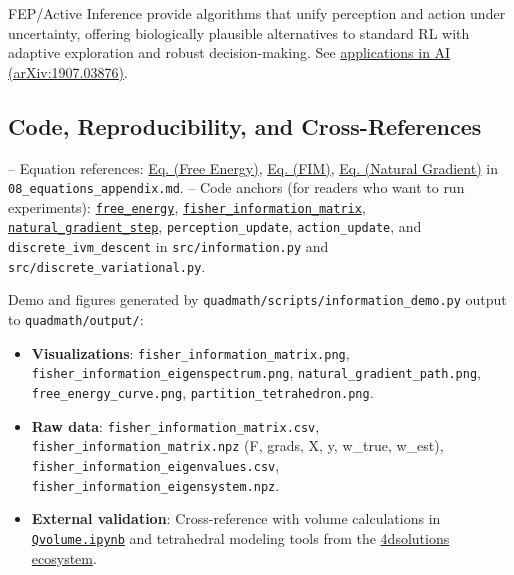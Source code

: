 \documentclass[
  10pt,
]{article}
\providecommand{\tightlist}{%
  \setlength{\itemsep}{0pt}\setlength{\parskip}{0pt}}
\begin{document}
FEP/Active Inference provide algorithms that unify perception and action
under uncertainty, offering biologically plausible alternatives to
standard RL with adaptive exploration and robust decision-making. See
\href{https://arxiv.org/abs/1907.03876}{applications in AI
(arXiv:1907.03876)}.

\hypertarget{code-reproducibility-and-cross-references}{%
\subsection{Code, Reproducibility, and
Cross-References}\label{code-reproducibility-and-cross-references}}

-- Equation references:
\href{08_equations_appendix.md\#eq:free_energy}{Eq. (Free Energy)},
\href{08_equations_appendix.md\#eq:fim}{Eq. (FIM)},
\href{08_equations_appendix.md\#eq:natgrad}{Eq. (Natural Gradient)} in
\texttt{08\_equations\_appendix.md}. -- Code anchors (for readers who
want to run experiments):
\href{03_quadray_methods.md\#code:free_energy}{\texttt{free\_energy}},
\href{03_quadray_methods.md\#code:fisher_information_matrix}{\texttt{fisher\_information\_matrix}},
\href{03_quadray_methods.md\#code:natural_gradient_step}{\texttt{natural\_gradient\_step}},
\texttt{perception\_update}, \texttt{action\_update}, and
\texttt{discrete\_ivm\_descent} in \texttt{src/information.py} and
\texttt{src/discrete\_variational.py}.

Demo and figures generated by
\texttt{quadmath/scripts/information\_demo.py} output to
\texttt{quadmath/output/}:

\begin{itemize}
\tightlist
\item
  \textbf{Visualizations}: \texttt{fisher\_information\_matrix.png},
  \texttt{fisher\_information\_eigenspectrum.png},
  \texttt{natural\_gradient\_path.png},
  \texttt{free\_energy\_curve.png}, \texttt{partition\_tetrahedron.png}.
\item
  \textbf{Raw data}: \texttt{fisher\_information\_matrix.csv},
  \texttt{fisher\_information\_matrix.npz} (F, grads, X, y, w\_true,
  w\_est), \texttt{fisher\_information\_eigenvalues.csv},
  \texttt{fisher\_information\_eigensystem.npz}.
\item
  \textbf{External validation}: Cross-reference with volume calculations
  in
  \href{https://github.com/4dsolutions/School_of_Tomorrow/blob/master/Qvolume.ipynb}{\texttt{Qvolume.ipynb}}
  and tetrahedral modeling tools from the
  \href{https://github.com/4dsolutions}{4dsolutions ecosystem}.
\end{itemize}
\end{document}
